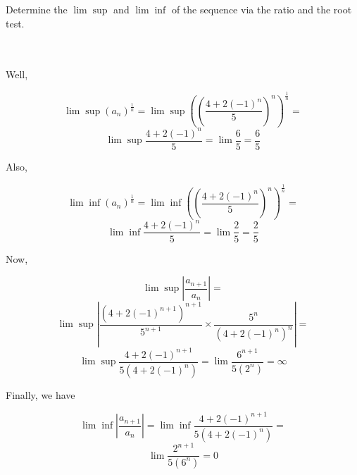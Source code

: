 Determine the $\lim\sup$ and $\lim\inf$ of the sequence via the ratio and the root test.\\\\

\begin{solution}\renewcommand{\qedsymbol}{}\ \\
    Well,
    
    $$\lim\sup(a_n)^{\frac1n}=\lim\sup((\frac{4+2(-1)^n}{5})^n)^{\frac1n}=$$
    $$\lim\sup\frac{4+2(-1)^n}{5}=\lim\frac65=\frac65$$
    
    Also,
    
    $$\lim\inf(a_n)^{\frac1n}=\lim\inf((\frac{4+2(-1)^n}{5})^n)^{\frac1n}=$$
    $$\lim\inf\frac{4+2(-1)^n}{5}=\lim\frac25=\frac25$$
    
    Now,
    
    $$\lim\sup|\frac{a_{n+1}}{a_n}|=$$
    $$\lim\sup|\frac{(4+2(-1)^{n+1})^{n+1}}{5^{n+1}}\times\frac{5^n}{(4+2(-1)^n)^n}|=$$
    $$\lim\sup\frac{4+2(-1)^{n+1}}{5(4+2(-1)^n)}=\lim\frac{6^{n+1}}{5(2^n)}=\infty$$
    
    Finally, we have
    
    $$\lim\inf|\frac{a_{n+1}}{a_n}|=\lim\inf\frac{4+2(-1)^{n+1}}{5(4+2(-1)^n)}=$$
    $$\lim\frac{2^{n+1}}{5(6^n)}=0$$

\end{solution}
